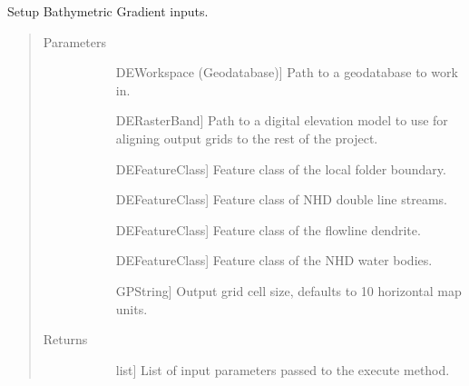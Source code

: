 \documentclass[letterpaper,10pt,english]{sphinxmanual}
\begin{document}
\begin{fulllineitems}
\begin{fulllineitems}
\label{\detokenize{StreamStats_DataPrep:StreamStats_DataPrep.SetupBathyGrad.getParameterInfo}}
Setup Bathymetric Gradient inputs.
\begin{quote}\begin{description}
\item[{Parameters}] \leavevmode\begin{description}
\item[{}] \leavevmode{[}DEWorkspace (Geodatabase){]}
Path to a geodatabase to work in.

\item[{}] \leavevmode{[}DERasterBand{]}
Path to a digital elevation model to use for aligning output grids to the rest of the project.

\item[{}] \leavevmode{[}DEFeatureClass{]}
Feature class of the local folder boundary.

\item[{}] \leavevmode{[}DEFeatureClass{]}
Feature class of NHD double line streams.

\item[{}] \leavevmode{[}DEFeatureClass{]}
Feature class of the flowline dendrite.

\item[{}] \leavevmode{[}DEFeatureClass{]}
Feature class of the NHD water bodies.

\item[{}] \leavevmode{[}GPString{]}
Output grid cell size, defaults to 10 horizontal map units.

\end{description}

\item[{Returns}] \leavevmode\begin{description}
\item[{}] \leavevmode{[}list{]}
List of input parameters passed to the execute method.

\end{description}

\end{description}\end{quote}

\end{fulllineitems}


\end{fulllineitems}
\end{document}
